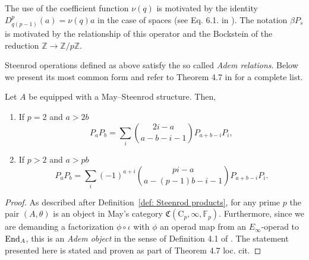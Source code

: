 \begin{remark}
	The use of the coefficient function $\nu(q)$ is motivated by the identity $D_{q(p-1)}^p(a) = \nu(q)a$ in the case of spaces (see Eq. 6.1. in \cite{steenrod1953cyclic}).
	The notation $\beta P_s$ is motivated by the relationship of this operator and the Bockstein of the reduction $\mathbb Z \to \mathbb Z/p\mathbb Z$.
\end{remark}

Steenrod operations defined as above satisfy the so called \textit{Adem relations}.
Below we present its most common form and refer to Theorem 4.7 in \cite{may1970general} for a complete list.

\begin{lemma}
	Let $A$ be equipped with a May--Steenrod structure.
	Then,
	\begin{enumerate}
		\item If $p = 2$ and $a > 2b$
		\begin{equation*}
		P_{a} P_{b} = \sum_i \binom{2i-a}{a-b-i-1} P_{a+b-i}P_i,
		\end{equation*}
		\item If $p > 2$ and $a > pb$
		\begin{equation*}
		P_{a} P_{b} = \sum_i (-1)^{a+i} \binom{pi-a}{a-(p-1)b-i-1} P_{a+b-i}P_i.
		\end{equation*}
	\end{enumerate}
\end{lemma}

\begin{proof}
	As described after Definition~\ref{def: Steenrod products}, for any prime $p$ the pair $(A, \theta)$ is an object in May's category $\mathfrak{C}(\mathrm C_p, \infty, \mathbb{F}_p)$.
	Furthermore, since we are demanding a factorization $\phi \circ \iota$ with $\phi$ an operad map from an $E_\infty$-operad to $\mathrm{End}_A$, this is an \textit{Adem object} in the sense of Definition 4.1 of \cite{may1970general}.
	The statement presented here is stated and proven as part of Theorem 4.7 loc. cit.
\end{proof}

